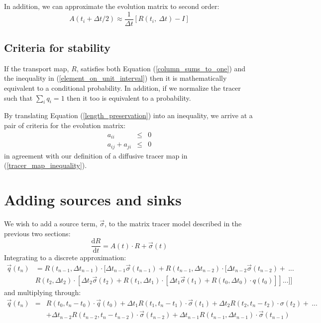 \documentclass[12pt]{article}
\begin{document}
In addition, we can approximate the evolution matrix to second order:
\begin{equation}
A(t_i+\Delta t/2) \approx \frac{1}{\Delta t} \left [R(t_i,~\Delta t) - I \right ]
\end{equation}

\subsection{Criteria for stability}

If the transport map, $R$, satisfies both Equation (\ref{column_sums_to_one})
and the inequality in (\ref{element_on_unit_interval}) then it is mathematically
equivalent to a conditional probability.
In addition, if we normalize the tracer such that $\sum_i q_i=1$
then it too is equivalent to a probability.

By translating Equation (\ref{length_preservation}) into an inequality, 
we arrive at a pair of criteria for the evolution matrix:
\begin{eqnarray}
a_{ii} & \le & 0 \\
a_{ij}+a_{ji} & \le & 0
\end{eqnarray}
in agreement with our definition of a diffusive tracer map in
(\ref{tracer_map_inequality}).


\section{Adding sources and sinks}

We wish to add a source term, $\vec \sigma$, to the matrix tracer model
described in the previous two sections:
\begin{equation}
\frac{\mathrm d R}{\mathrm d t} = A(t) \cdot R + \vec \sigma(t)
\end{equation}
Integrating to a discrete approximation:
\begin{eqnarray}
\vec q(t_n) & = R(t_{n-1}, \Delta t_{n-1}) \cdot [\Delta t_{n-1}\vec \sigma(t_{n-1})+R(t_{n-1}, \Delta t_{n-2}) 
\cdot [\Delta t_{n-2} \vec \sigma(t_{n-2})+~...\nonumber \\
& R(t_2, \Delta t_2) \cdot [\Delta t_2 \vec \sigma(t_2) +
R(t_1, \Delta t_1) \cdot [\Delta t_1 \vec \sigma(t_1) + R(t_0, \Delta t_0) \cdot q(t_0) ]]...]]
\end{eqnarray}
and multiplying through:
\begin{eqnarray}
\vec q(t_n) & = & R(t_0,t_n-t_0) \cdot \vec q(t_0) + \Delta t_1 R(t_1,t_n-t_1) \cdot \vec \sigma(t_1) +
\Delta t_2 R(t_2, t_n-t_2) \cdot \sigma(t_2) + ~...\nonumber \\ 
& & + \Delta t_{n-2} R(t_{n-2},t_n-t_{n-2}) \cdot \vec\sigma(t_{n-2}) + 
\Delta t_{n-1} R(t_{n-1},\Delta t_{n-1}) \cdot \vec \sigma(t_{n-1})
\end{eqnarray}



\end{document}
